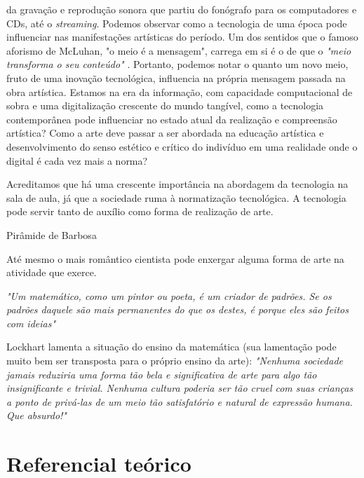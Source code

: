 \documentclass[12pt, a4paper, titlepage]{article}
\begin{document}
da gravação e reprodução sonora que partiu do fonógrafo para os computadores e CDs, até o \emph{streaming}. Podemos observar como a tecnologia 
de uma época pode influenciar nas manifestações artísticas do período. Um dos sentidos que o famoso aforismo de McLuhan, "o meio é a mensagem", 
carrega em si é o de que o \emph{"meio transforma o seu conteúdo"} \cite[p.50]{braga_mcluhan}. Portanto, podemos notar o quanto um novo meio, fruto de
uma inovação tecnológica, influencia na própria mensagem passada na obra artística.
Estamos na era da informação, com capacidade computacional de sobra e 
uma digitalização crescente do mundo tangível, como a tecnologia contemporânea pode influenciar no estado atual da realização e compreensão artística?
Como a arte deve passar a ser abordada na educação artística e desenvolvimento do senso estético e crítico do indivíduo em uma realidade onde o digital
é cada vez mais a norma?


Acreditamos que há uma crescente importância na abordagem da tecnologia na sala de aula, já que a sociedade ruma à normatização tecnológica.
A tecnologia pode servir tanto de auxílio como forma de realização de arte.

Pirâmide de Barbosa

Até mesmo o mais romântico cientista pode enxergar alguma forma de arte na atividade que exerce.

\emph{"Um matemático, como um pintor ou poeta, é um criador de padrões. Se os padrões daquele são mais permanentes do que os destes, é porque eles são feitos com ideias"}
\cite{hardy_apology}

Lockhart lamenta a situação do ensino da matemática (sua lamentação pode muito bem ser transposta para o próprio ensino da arte):
\emph{"Nenhuma sociedade jamais reduziria uma forma tão bela e significativa de arte para algo tão insignificante e trivial. Nenhuma cultura poderia ser tão cruel
com suas crianças a ponto de privá-las de um meio tão satisfatório e natural de expressão humana. Que absurdo!"}
\cite{lockhart_lament}





\section{Referencial teórico}


\printbibliography
\end{document}
